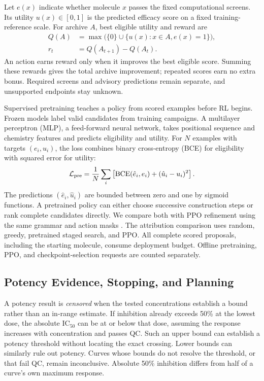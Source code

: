 \documentclass[letterpaper]{article}
\begin{document}
Let $e(x)$ indicate whether molecule $x$ passes the fixed computational screens. Its utility $u(x)\in[0,1]$ is the predicted efficacy score on a fixed training-reference scale. For archive $A$, best eligible utility and reward are
\begin{align}
 Q(A)&=\max\bigl(\{0\}\cup\{u(x):x\in A,e(x)=1\}\bigr),\label{eq:archive}\\
 r_t&=Q(A_{t+1})-Q(A_t).\label{eq:reward}
\end{align}
An action earns reward only when it improves the best eligible score. Summing these rewards gives the total archive improvement; repeated scores earn no extra bonus. Required screens and advisory predictions remain separate, and unsupported endpoints stay unknown.

Supervised pretraining teaches a policy from scored examples before RL begins. Frozen models label valid candidates from training campaigns. A multilayer perceptron (MLP), a feed-forward neural network, takes positional sequence and chemistry features and predicts eligibility and utility. For $N$ examples with targets $(e_i,u_i)$, the loss combines binary cross-entropy (BCE) for eligibility with squared error for utility:
\begin{equation}
 \mathcal L_{\rm pre}=\frac1N\sum_i\left[
 \operatorname{BCE}(\hat e_i,e_i)+(\hat u_i-u_i)^2\right].
 \label{eq:pretraining}
\end{equation}
The predictions $(\hat e_i,\hat u_i)$ are bounded between zero and one by sigmoid functions. A pretrained policy can either choose successive construction steps or rank complete candidates directly. We compare both with PPO refinement using the same grammar and action masks \citep{ppo,masking}. The attribution comparison uses random, greedy, pretrained staged search, and PPO. All complete scored proposals, including the starting molecule, consume deployment budget. Offline pretraining, PPO, and checkpoint-selection requests are counted separately.

\subsection{Potency Evidence, Stopping, and Planning}
A potency result is \emph{censored} when the tested concentrations establish a bound rather than an in-range estimate. If inhibition already exceeds 50\% at the lowest dose, the absolute $\mathrm{IC}_{50}$ can be at or below that dose, assuming the response increases with concentration and passes QC. Such an upper bound can establish a potency threshold without locating the exact crossing. Lower bounds can similarly rule out potency. Curves whose bounds do not resolve the threshold, or that fail QC, remain inconclusive. Absolute 50\% inhibition differs from half of a curve's own maximum response.
\end{document}
